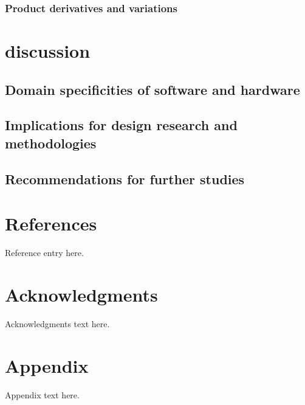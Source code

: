 \documentclass{ICED-Paper}%
\begin{document}
\subsubsection{Product derivatives and variations}

\section{discussion}
\subsection{Domain specificities of software and hardware}

\subsection{Implications for design research and methodologies}

\subsection{Recommendations for further studies}

\section*{References}

\begin{thebibliography}

Reference entry here.

\end{thebibliography}

\section*{Acknowledgments}

Acknowledgments text here.

\appendix

\section*{Appendix}

Appendix text here.
\end{document}
